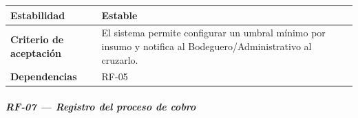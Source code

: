 \documentclass[
]{article}
\begin{document}
{\begin{longtable}[]{|
  >{\raggedright\arraybackslash}p{}|
  >{\raggedright\arraybackslash}p{}|}
\hline
\textbf{Estabilidad} & \begin{minipage}[t]{\linewidth}\raggedright
Estable
\end{minipage} \\
\hline
\textbf{Criterio de aceptación} &
\begin{minipage}[t]{\linewidth}\raggedright
El sistema permite configurar un umbral mínimo por insumo y notifica al Bodeguero/Administrativo al cruzarlo.
\end{minipage} \\
\hline
\textbf{Dependencias} & \begin{minipage}[t]{\linewidth}\raggedright
RF-05
\end{minipage} \\
\hline
\end{longtable}
}

\subparagraph{RF-07 --- Registro del proceso de cobro}\label{rf-07-registro-del-proceso-de-cobro}
\end{document}
